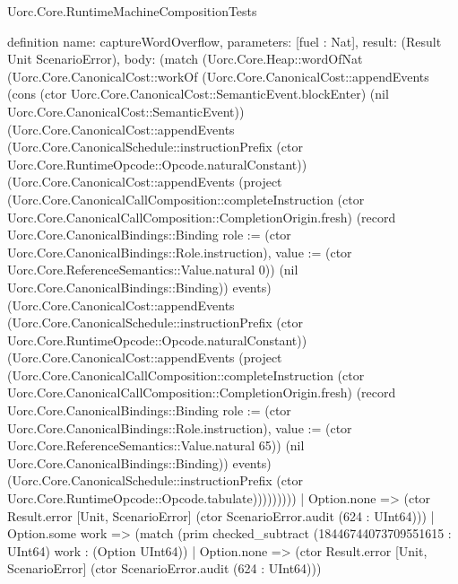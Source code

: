\begin{lexlean}{Uorc.Core.RuntimeMachineCompositionTests}
\begin{semanticmodule}
definition{
  name: captureWordOverflow,
  parameters: [fuel : Nat],
  result: (Result Unit ScenarioError),
  body: (match (Uorc.Core.Heap::wordOfNat (Uorc.Core.CanonicalCost::workOf (Uorc.Core.CanonicalCost::appendEvents (cons (ctor Uorc.Core.CanonicalCost::SemanticEvent.blockEnter) (nil Uorc.Core.CanonicalCost::SemanticEvent)) (Uorc.Core.CanonicalCost::appendEvents (Uorc.Core.CanonicalSchedule::instructionPrefix (ctor Uorc.Core.RuntimeOpcode::Opcode.naturalConstant)) (Uorc.Core.CanonicalCost::appendEvents (project (Uorc.Core.CanonicalCallComposition::completeInstruction (ctor Uorc.Core.CanonicalCallComposition::CompletionOrigin.fresh) (record Uorc.Core.CanonicalBindings::Binding {role := (ctor Uorc.Core.CanonicalBindings::Role.instruction), value := (ctor Uorc.Core.ReferenceSemantics::Value.natural 0)}) (nil Uorc.Core.CanonicalBindings::Binding)) events) (Uorc.Core.CanonicalCost::appendEvents (Uorc.Core.CanonicalSchedule::instructionPrefix (ctor Uorc.Core.RuntimeOpcode::Opcode.naturalConstant)) (Uorc.Core.CanonicalCost::appendEvents (project (Uorc.Core.CanonicalCallComposition::completeInstruction (ctor Uorc.Core.CanonicalCallComposition::CompletionOrigin.fresh) (record Uorc.Core.CanonicalBindings::Binding {role := (ctor Uorc.Core.CanonicalBindings::Role.instruction), value := (ctor Uorc.Core.ReferenceSemantics::Value.natural 65)}) (nil Uorc.Core.CanonicalBindings::Binding)) events) (Uorc.Core.CanonicalSchedule::instructionPrefix (ctor Uorc.Core.RuntimeOpcode::Opcode.tabulate)))))))))
    | Option.none => (ctor Result.error [Unit, ScenarioError] (ctor ScenarioError.audit (624 : UInt64)))
    | Option.some work => (match (prim checked_subtract (18446744073709551615 : UInt64) work : (Option UInt64))
      | Option.none => (ctor Result.error [Unit, ScenarioError] (ctor ScenarioError.audit (624 : UInt64)))
}
\end{semanticmodule}
\end{lexlean}

